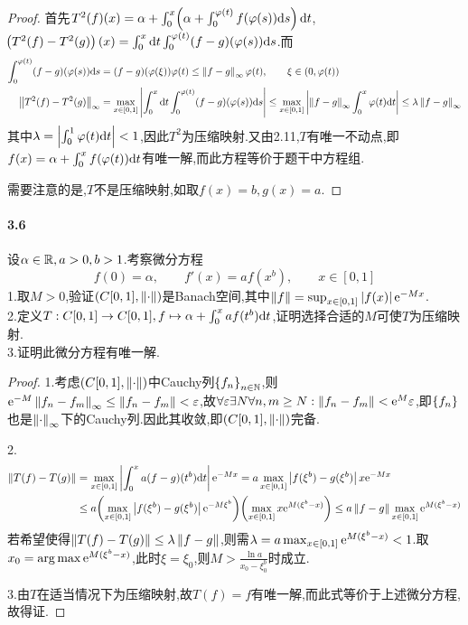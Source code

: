 \documentclass[UTF8]{article}
\begin{document}
\begin{proof}
    首先$T^2(f)(x)=\alpha+\int_0^x\!\left(\alpha+\int_0^{\varphi(t)}f(\varphi(s))\mathrm{d} s\right)\mathrm{d} t$,$\!\left(T^2(f)-T^2(g)\right)(x)=\int_0^x\mathrm{d} t \int_0^{\varphi(t)}(f-g)(\varphi(s))\mathrm{d} s$.而$$\begin{aligned}
        \int_0^{\varphi(t)}(f-g)(\varphi(s))\mathrm{d} s&=(f-g)(\varphi(\xi))\varphi(t)\leq \left\|f-g\right\|_\infty\varphi(t),\qquad \xi\in (0,\varphi(t))\\
        \left\|T^2(f)-T^2(g)\right\|_\infty&=\max_{x\in [0,1]}\left|\int_0^x \mathrm{d} t \int_0^{\varphi(t)}(f-g)(\varphi(s))\mathrm{d} s\right|\leq \max_{x\in [0,1]}\left|\left\|f-g\right\|_\infty\int_0^x \varphi(t)\mathrm{d} t\right|\leq \lambda\left\|f-g\right\|_\infty
    \end{aligned}$$
    其中$\lambda=\left|\int _0^1 \varphi(t)\mathrm{d} t\right|<1$,因此$T^2$为压缩映射.又由2.11,$T$有唯一不动点,即$f(x)=\alpha+\int_0^x f(\varphi(t))\mathrm{d} t$有唯一解,而此方程等价于题干中方程组.

    需要注意的是,$T$不是压缩映射,如取$f(x)=b,g(x)=a$.
\end{proof}

\paragraph*{3.6}设$\alpha\in \mathbb{R}, a>0,b>1$.考察微分方程$$f(0)=\alpha,\qquad f'(x)=af(x^b),\qquad x\in [0,1]$$
1.取$M>0$,验证$(C[0,1],\left\|\cdot\right\|)$是Banach空间,其中$\left\|f\right\|=\sup_{x\in [0,1]}\left|f(x)\right|\mathrm{e}^{-Mx}$.\\
2.定义$T:C[0,1]\to C[0,1], f\mapsto \alpha+\int_0^x af(t^b)\mathrm{d} t$,证明选择合适的$M$可使$T$为压缩映射.\\
3.证明此微分方程有唯一解.

\begin{proof}
    1.考虑$(C[0,1],\left\|\cdot\right\|)$中Cauchy列$\left\{f_n\right\}_{n\in \mathbb{N}}$,则$\mathrm{e}^{-M}\left\|f_n-f_m\right\|_\infty\leq \left\|f_n-f_m\right\|< \varepsilon$,故$\forall \varepsilon\exists N\forall n,m\geq N:\left\|f_n-f_m\right\|<\mathrm{e}^M\varepsilon$,即$\left\{f_n\right\}$也是$\left\|\cdot\right\|_\infty$下的Cauchy列.因此其收敛,即$(C[0,1],\left\|\cdot\right\|)$完备.

    2.$$\begin{aligned}
        \left\|T(f)-T(g)\right\|&=\max_{x\in [0,1]}\left|\int_0^x a(f-g)(t^b)\mathrm{d} t\right|\mathrm{e}^{-Mx}=a\max_{x\in [0,1]}\left|f(\xi^b)-g(\xi^b)\right|x\mathrm{e}^{-Mx}\\
        &\leq a\!\left(\max_{x\in [0,1]}\left|f(\xi^b)-g(\xi^b)\right|\mathrm{e}^{-M\xi^b}\right)\!\left(\max_{x\in [0,1]}x\mathrm{e}^{M(\xi^b-x)}\right)\leq a\left\|f-g\right\|\max_{x\in [0,1]}\mathrm{e}^{M(\xi^b-x)}
    \end{aligned}$$
    若希望使得$\left\|T(f)-T(g)\right\|\leq \lambda\left\|f-g\right\|$,则需$\lambda=a\max_{x\in [0,1]}\mathrm{e}^{M(\xi^b-x)}<1$.取$x_0=\arg\max \mathrm{e}^{M(\xi^b-x)}$,此时$\xi=\xi_0$,则$M>\frac{\ln a}{x_0-\xi_0^b}$时成立.

    3.由$T$在适当情况下为压缩映射,故$T(f)=f$有唯一解,而此式等价于上述微分方程,故得证.
\end{proof}
\end{document}
